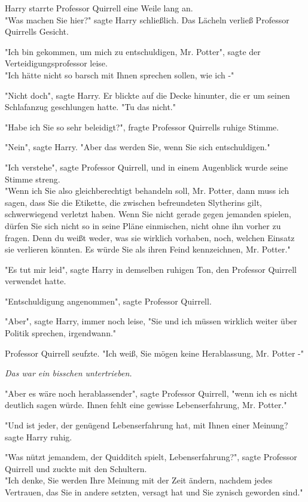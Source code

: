 {Harry starrte Professor Quirrell eine Weile lang an.\\ "Was machen Sie hier?" sagte Harry schließlich. Das Lächeln verließ Professor Quirrells Gesicht.

"Ich bin gekommen, um mich zu entschuldigen, Mr. Potter", sagte der Verteidigungsprofessor leise.\\ "Ich hätte nicht so barsch mit Ihnen sprechen sollen, wie ich -"

"Nicht doch", sagte Harry. Er blickte auf die Decke hinunter, die er um seinen Schlafanzug geschlungen hatte. "Tu das nicht."

"Habe ich Sie so sehr beleidigt?", fragte Professor Quirrells ruhige Stimme.

"Nein", sagte Harry. "Aber das werden Sie, wenn Sie sich entschuldigen."

"Ich verstehe", sagte Professor Quirrell, und in einem Augenblick wurde seine Stimme streng.\\ "Wenn ich Sie also gleichberechtigt behandeln soll, Mr. Potter, dann muss ich sagen, dass Sie die Etikette, die zwischen befreundeten Slytherins gilt, schwerwiegend verletzt haben. Wenn Sie nicht gerade gegen jemanden spielen, dürfen Sie sich nicht so in seine Pläne einmischen, nicht ohne ihn vorher zu fragen. Denn du weißt weder, was sie wirklich vorhaben, noch, welchen Einsatz sie verlieren könnten. Es würde Sie als ihren Feind kennzeichnen, Mr. Potter."

"Es tut mir leid", sagte Harry in demselben ruhigen Ton, den Professor Quirrell verwendet hatte.

"Entschuldigung angenommen", sagte Professor Quirrell.

"Aber", sagte Harry, immer noch leise, "Sie und ich müssen wirklich weiter über Politik sprechen, irgendwann."

Professor Quirrell seufzte. "Ich weiß, Sie mögen keine Herablassung, Mr. Potter -"

\emph{Das war ein bisschen untertrieben.}

"Aber es wäre noch herablassender", sagte Professor Quirrell, "wenn ich es nicht deutlich sagen würde. Ihnen fehlt eine gewisse Lebenserfahrung, Mr. Potter."

"Und ist jeder, der genügend Lebenserfahrung hat, mit Ihnen einer Meinung? sagte Harry ruhig.

"Was nützt jemandem, der Quidditch spielt, Lebenserfahrung?", sagte Professor Quirrell und zuckte mit den Schultern.\\ "Ich denke, Sie werden Ihre Meinung mit der Zeit ändern, nachdem jedes Vertrauen, das Sie in andere setzten, versagt hat und Sie zynisch geworden sind."

}
